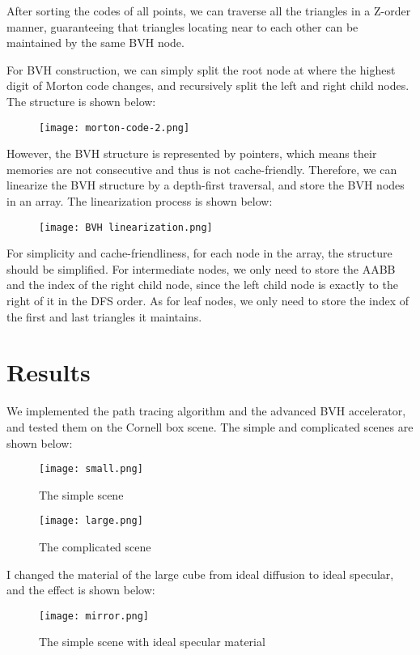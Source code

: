 \documentclass[acmtog]{acmart}
\begin{document}
After sorting the codes of all points, we can traverse all the triangles in a Z-order manner, guaranteeing that triangles locating near to each other can be maintained by the same BVH node.

For BVH construction, we can simply split the root node at where the highest digit of Morton code changes, and recursively split the left and right child nodes. The structure is shown below:
\begin{figure}[htbp]
    \centering
    \texttt{[image: morton-code-2.png]}
\end{figure}

However, the BVH structure is represented by pointers, which means their memories are not consecutive and thus is not cache-friendly. Therefore, we can linearize the BVH structure by a depth-first traversal, and store the BVH nodes in an array. The linearization process is shown below:
\begin{figure}[htbp]
    \centering
    \texttt{[image: BVH linearization.png]}
\end{figure}

For simplicity and cache-friendliness, for each node in the array, the structure should be simplified. For intermediate nodes, we only need to store the AABB and the index of the right child node, since the left child node is exactly to the right of it in the DFS order. As for leaf nodes, we only need to store the index of the first and last triangles it maintains.

\section{Results}
\hspace{8pt}
We implemented the path tracing algorithm and the advanced BVH accelerator, and tested them on the Cornell box scene. The simple and complicated scenes are shown below:
\begin{figure}[htbp]
    \centering
    \texttt{[image: small.png]}
    \caption{The simple scene}
    \texttt{[image: large.png]}
    \caption{The complicated scene}
\end{figure}

\pagebreak

I changed the material of the large cube from ideal diffusion to ideal specular, and the effect is shown below:
\begin{figure}[htbp]
    \centering
    \texttt{[image: mirror.png]}
    \caption{The simple scene with ideal specular material}
\end{figure}
\end{document}

